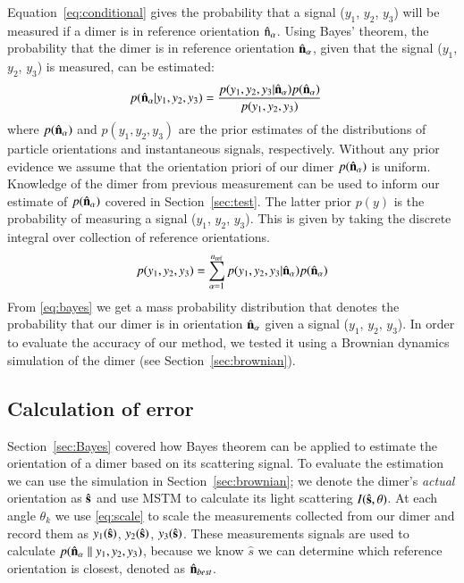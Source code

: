 \documentclass[final, 3p]{elsarticle}
\begin{document}
Equation~\eqref{eq:conditional} gives the probability that a signal
($y_1$, $y_2$, $y_3$) will be measured if a dimer is in reference
orientation $\hat{\rm n}_\alpha$.
%
Using Bayes' theorem, the probability that the dimer is in reference
orientation $\hat{\bf n}_\alpha$, given that the signal ($y_1$, $y_2$,
$y_3$) is measured, can be estimated:
\begin{align}
  \label{eq:bayes}
  p(\hat{\bf n}_\alpha| y_1,y_2,y_3)
  &=
    \frac{p(y_1,y_2,y_3|\hat{\bf n}_\alpha)
    p(\hat{\bf n}_\alpha)}{p(y_1, y_2, y_3)}
\end{align}
where $p(\hat{\bf n}_\alpha)$ and $p(y_1, y_2, y_3)$ are the prior
estimates of the distributions of particle orientations and
instantaneous signals, respectively.
%
Without any prior evidence we assume that the orientation priori of our dimer $p(\hat{\bf n}_{\alpha})$ is uniform. Knowledge of the dimer from previous measurement can be used to inform our estimate of $p(\hat{\bf n}_{\alpha})$ covered in Section~\ref{sec:test}.  The latter prior $p(y)$ is the probability of measuring a signal ($y_1$, $y_2$, $y_3$).  This is given by taking the discrete integral over collection of reference orientations.
\begin{align}
  p(y_1, y_2, y_3)
  =
  \sum_{\alpha=1}^{n_{\rm ref}}
  p(y_1, y_2, y_3|\hat{\bf n}_\alpha)
  p(\hat{\bf n}_\alpha)
\end{align}
From \eqref{eq:bayes} we get a mass probability distribution that denotes the probability that our dimer is in orientation $\hat{\bf n}_{\alpha}$ given a signal ($y_1$, $y_2$, $y_3$). In order to evaluate the accuracy of our method, we tested it using a Brownian dynamics simulation of the dimer (see Section~\ref{sec:brownian}).

\subsection{Calculation of error}
\label{sec:divergence}
Section~\ref{sec:Bayes} covered how Bayes theorem can be applied to estimate the orientation of a dimer based on its scattering signal. To evaluate the estimation we can use the simulation in Section~\ref{sec:brownian}; we denote the dimer's \emph{actual} orientation as $\hat{\bf s}$ and use MSTM to calculate its light scattering $I(\hat{\bf s}, \theta)$. At each angle $\theta_k$ we use \eqref{eq:scale} to scale the measurements collected from our dimer and record them as $y_1(\hat{\bf s})$, $y_2(\hat{\bf s})$, $y_3(\hat{\bf s})$. These measurements signals are used to calculate $p(\hat{\bf n}_{\alpha}\parallel y_1, y_2, y_3)$, because we know $\hat{s}$ we can determine which reference orientation is closest, denoted as $\hat{\bf n}_{best}$.
\end{document}
